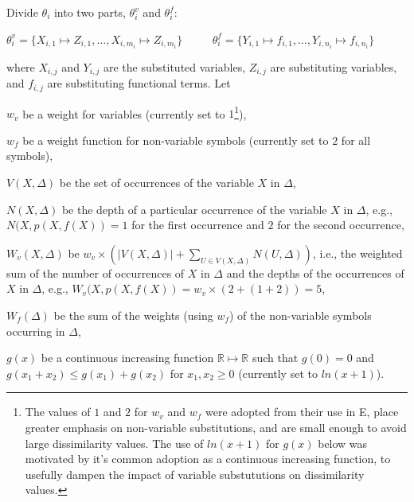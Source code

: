 \documentclass[EPiC]{easychair}
\newenvironment{packed_itemize}{
\vspace*{-0.5em}
\begin{itemize}
  \setlength{\partopsep}{0pt}
  \setlength{\itemsep}{1pt}
  \setlength{\parskip}{0pt}
  \setlength{\parsep}{0pt}
}{\end{itemize}}
\begin{document}
Divide $\theta_i$ into two parts, $\theta_i^v$ and $\theta_i^f$:
\begin{center}
$\theta_i^v=\{X_{i,1}\mapsto Z_{i,1},\dots,X_{i,m_i}\mapsto Z_{i,m_i}\}$
~~~~
$\theta_i^f=\{Y_{i,1}\mapsto f_{i,1},\dots,Y_{i,n_i}\mapsto f_{i,n_i}\}$
\end{center}
where $X_{i,j}$ and $Y_{i,j}$ are the substituted variables, 
$Z_{i,j}$ are substituting variables, and
$f_{i,j}$ are substituting functional terms.
Let
\begin{packed_itemize}
\item $w_v$ be a weight for variables (currently set to $1$\footnote{%
The values of $1$ and $2$ for $w_v$ and $w_f$ were adopted from their use 
in E, place greater emphasis on non-variable substitutions, and are small 
enough to avoid large dissimilarity values.
The use of $ln(x+1)$ for $g(x)$ below was motivated by it's common
adoption as a continuous increasing function, to usefully dampen the
impact of variable substututions on dissimilarity values.}),
\item $w_f$ be a weight function for non-variable symbols (currently
      set to $2$ for all symbols),
\item $V(X,\Delta)$ be the set of occurrences of the variable $X$ in $\Delta$,
\item $N(X,\Delta)$ be the depth of a particular occurrence of the 
      variable $X$ in $\Delta$, e.g., $N(X,p(X,f(X)) = 1$ for the first 
      occurrence and $2$ for the second occurrence,
\item $W_v(X,\Delta)$ be 
      $w_v \times (|V(X,\Delta)| + \sum_{U \in V(X,\Delta)} N(U,\Delta))$,
      i.e., the weighted sum of the number of occurrences of $X$ in $\Delta$ 
      and the depths of the occurrences of $X$ in $\Delta$, e.g., 
      $W_v(X,p(X,f(X)) = w_v \times (2 + (1+2)) = 5$,
\item $W_f(\Delta)$ be the sum of the weights (using $w_f$) of the 
      non-variable symbols occurring in $\Delta$,
\item $g(x)$ be a continuous increasing function 
      $\mathbb{R} \mapsto \mathbb{R}$ such that 
      $g(0)=0$
      and
      $g(x_1+x_2) \leq g(x_1)+ g(x_2)$ for $x_1, x_2\geq0$
      (currently set to $ln(x+1)$).
\end{packed_itemize}
\end{document}
